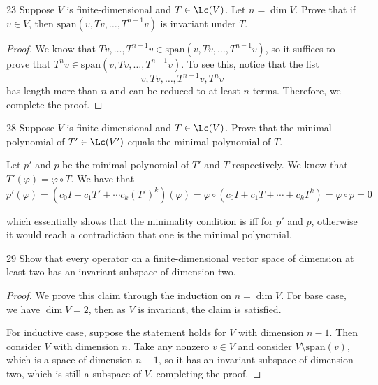 \documentclass{extarticle}
\begin{document}
\begin{problem}{23}
    Suppose \(V\) is finite-dimensional and \(T \in \Lc(V)\). Let \(n = \dim V\). Prove that 
    if \(v \in V\), then \(\text{span}(v, Tv, \ldots, T^{n-1}v)\) is invariant under \(T\).
\end{problem}

\begin{proof}
We know that \(Tv, \ldots, T^{n-1}v \in \text{span}(v, Tv, \ldots, T^{n-1}v)\), so it suffices 
to prove that \(T^n v \in \text{span}(v, Tv, \ldots, T^{n-1}v)\). To see this, notice that the list 
\[v, Tv, \ldots, T^{n-1}v, T^n v\]
has length more than \(n\) and can be reduced to at least \(n\) terms. Therefore, we complete the proof.
\end{proof}

\begin{problem}{28}
    Suppose \(V\) is finite-dimensional and \(T \in \Lc(V)\). Prove that the minimal polynomial of 
    \(T' \in \Lc(V')\) equals the minimal polynomial of \(T\).
\end{problem}

Let \(p'\) and \(p\) be the minimal polynomial of \(T'\) and \(T\) respectively. We know that \(T'(\varphi)
= \varphi \circ T\). We have that  
\[p'(\varphi) = (c_0 I + c_1 T' + \cdots c_k(T')^k)(\varphi) 
= \varphi \circ (c_0 I + c_1 T + \cdots + c_k T^k) = \varphi \circ p = 0\]

which essentially shows that the minimality condition is iff for \(p'\) and \(p\), otherwise it would reach 
a contradiction that one is the minimal polynomial.

\begin{problem}{29}
    Show that every operator on a finite-dimensional vector space of dimension at least two has an 
    invariant subspace of dimension two. 
\end{problem}

\begin{proof}
We prove this claim through the induction on \(n = \dim V\). For base case, we have \(\dim V = 2\), then as 
\(V\) is invariant, the claim is satisfied. 

For inductive case, suppose the statement holds for \(V\) with dimension \(n-1\). Then consider \(V\) with 
dimension \(n\). Take any nonzero \(v \in V\) and consider \(V \setminus \text{span}(v)\), which is a space of 
dimension \(n - 1\), so it has an invariant subspace of dimension two, which is still a subspace of \(V\), 
completing the proof.
\end{proof}
\end{document}
